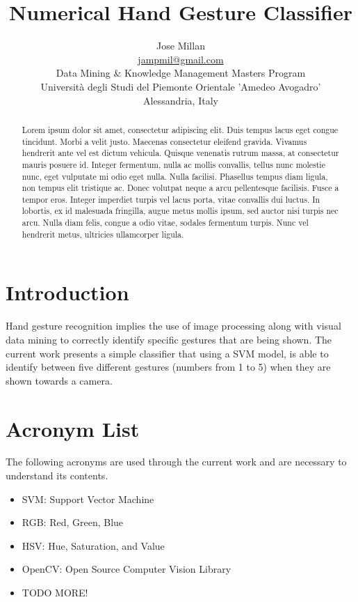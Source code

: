 \documentclass[a4paper,10pt,english]{article}
\title{Numerical Hand Gesture Classifier}
\author{Jose Millan\\
    \url{jampmil@gmail.com}\\
    Data Mining \& Knowledge Management Masters Program\\
    Università degli Studi del Piemonte Orientale 'Amedeo Avogadro'\\
    Alessandria, Italy}
\date{}
\begin{document}
    \maketitle
    
    \begin{abstract}
        Lorem ipsum dolor sit amet, consectetur adipiscing elit. Duis tempus lacus eget congue tincidunt. Morbi a velit justo. Maecenas consectetur eleifend gravida. Vivamus hendrerit ante vel est dictum vehicula. Quisque venenatis rutrum massa, at consectetur mauris posuere id. Integer fermentum, nulla ac mollis convallis, tellus nunc molestie nunc, eget vulputate mi odio eget nulla. Nulla facilisi. Phasellus tempus diam ligula, non tempus elit tristique ac. Donec volutpat neque a arcu pellentesque facilisis. Fusce a tempor eros. Integer imperdiet turpis vel lacus porta, vitae convallis dui luctus. In lobortis, ex id malesuada fringilla, augue metus mollis ipsum, sed auctor nisi turpis nec arcu. Nulla diam felis, congue a odio vitae, sodales fermentum turpis. Nunc vel hendrerit metus, ultricies ullamcorper ligula. 
    \end{abstract}
    

     \section{Introduction}\label{sec:intro}
     
        Hand gesture recognition implies the use of image processing along with visual data mining to correctly identify specific gestures that are being shown. The current work presents a simple classifier that using a SVM model, is able to identify between five different gestures (numbers from 1 to 5) when they are shown towards a camera.

     \section{Acronym List}
     
        The following acronyms are used through the current work and are necessary to understand its contents.
         
        \begin{itemize}[topsep=0pt,itemsep=0ex,partopsep=1ex,parsep=1ex]
             \item SVM: Support Vector Machine
             \item RGB: Red, Green, Blue
             \item HSV: Hue, Saturation, and Value
             \item OpenCV: Open Source Computer Vision Library
             \item TODO MORE!
         \end{itemize}
     
\end{document}
